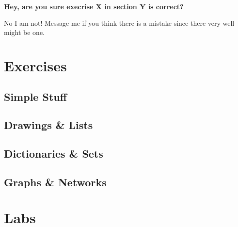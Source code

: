 \begin{flushleft}
\textbf{Hey, are you sure execrise X in section Y is correct?}
\end{flushleft}
\begin{flushright}
No I am not! Message me if you think there is a mistake since there very well might be one.
\end{flushright}

\tableofcontents

\section{Exercises}

    \subsection{Simple Stuff}
    

    \subsection{Drawings \& Lists}
    

    \subsection{Dictionaries \& Sets}
    

    \subsection{Graphs \& Networks}

\section{Labs}
    


\clearpage
\doclicenseThis


